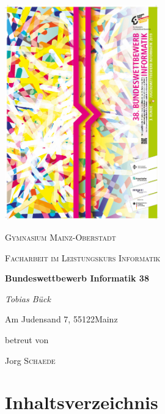 \documentclass[a4paper,12pt,arial]{scrartcl}
\newcommand{\Name}{Tobias Bück}
\newcommand{\Strasse}{Am Judensand 7}
\newcommand{\Ort}{Mainz}
\newcommand{\PLZ}{55122}
\newcommand{\Schule}{Gymnasium Mainz-Oberstadt}
\newcommand{\Leistungskurs}{Informatik}
\newcommand{\Betreuer}{Jorg \textsc{Schaede}}
\newcommand{\Thema}{Bundeswettbewerb Informatik 38}
\begin{document}
\begin{titlepage}
	\centering
	\includegraphics[width=0.5\textwidth]{BWinf38_image.pdf}
	\\
    \textit{\textcite{bwinfPlakat}}
	\par\vspace{1cm}
	
	{\scshape\LARGE \Schule \par}
	\vspace{1cm}
	{\scshape\Large Facharbeit im Leistungskurs \Leistungskurs\par}
	\vspace{1.5cm}
	{\huge\bfseries \Thema\par}
	\vspace{2cm}
	{\Large\itshape \Name\par}
	\small{\Strasse, \PLZ \space \Ort}
	\vfill
\par
	betreut von\par
	\Betreuer

\end{titlepage}

\begin{abstract}
Diese Arbeit handelt von der Bearbeitung des Bundeswettbewerb Informatik 38. Dabei werden Graphentheorie, Algorithmen und Datenstrukturen zur Lösung komplexer Probleme genutzt. In der ersten Aufgabe wird ein Computer-Programm entwickelt, welches das Brettspiel Stromrallye löst. Bei der 2. Aufgabe geht es darum in einem Straßennetz den Weg zu finden, der sehr schnell ist, aber auch wenige Abbiegungen beinhaltet.
\end{abstract}
\section{Inhaltsverzeichnis}
\tableofcontents
\end{document}
